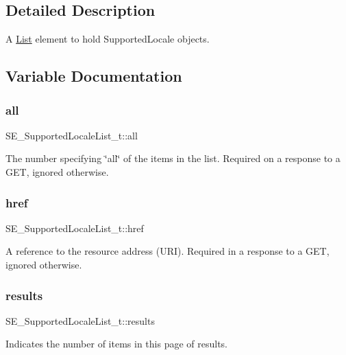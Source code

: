 \subsection{Detailed Description}
A \hyperlink{structList}{List} element to hold Supported\+Locale objects. 

\subsection{Variable Documentation}
\mbox{\label{group__SupportedLocaleList_ga6e78274b14e2975edfae1ea26dce27ba}} 
\subsubsection{\texorpdfstring{all}{all}}
{\footnotesize\ttfamily S\+E\+\_\+\+Supported\+Locale\+List\+\_\+t\+::all}

The number specifying \char`\"{}all\char`\"{} of the items in the list. Required on a response to a G\+ET, ignored otherwise. \mbox{\label{group__SupportedLocaleList_ga71abc6b4fb4809aa25326cc667563089}} 
\subsubsection{\texorpdfstring{href}{href}}
{\footnotesize\ttfamily S\+E\+\_\+\+Supported\+Locale\+List\+\_\+t\+::href}

A reference to the resource address (U\+RI). Required in a response to a G\+ET, ignored otherwise. \mbox{\label{group__SupportedLocaleList_ga158a15d56c70b7f3485e85ee88e2c744}} 
\subsubsection{\texorpdfstring{results}{results}}
{\footnotesize\ttfamily S\+E\+\_\+\+Supported\+Locale\+List\+\_\+t\+::results}

Indicates the number of items in this page of results. 